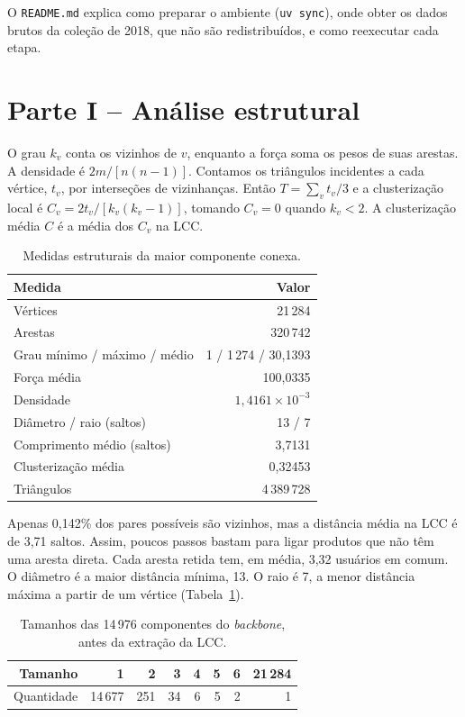 \documentclass[sigconf,nonacm]{webmedia}
\begin{document}
O \texttt{README.md} explica como preparar o ambiente
(\texttt{uv sync}), onde obter os dados brutos da coleção de 2018,
que não são redistribuídos, e como reexecutar cada etapa.

\section{Parte I -- Análise estrutural}
\label{sec:parte1}

O grau \(k_v\) conta os vizinhos de \(v\), enquanto a força soma
os pesos de suas arestas. A densidade é \(2m/[n(n-1)]\).
Contamos os triângulos incidentes a cada vértice, \(t_v\), por
interseções de vizinhanças. Então \(T=\sum_v t_v/3\) e a
clusterização local é \(C_v=2t_v/[k_v(k_v-1)]\), tomando
\(C_v=0\) quando \(k_v<2\). A clusterização média \(C\) é a
média dos \(C_v\) na LCC.

\begin{table}[tbp]
\centering
\caption{Medidas estruturais da maior componente conexa.}
\label{tab:estrutural}
\small
\begin{tabular}{@{}lr@{}}
\toprule
Medida & Valor \\
\midrule
Vértices & 21\,284 \\
Arestas & 320\,742 \\
Grau mínimo / máximo / médio & 1 / 1\,274 / 30,1393 \\
Força média & 100,0335 \\
Densidade & \(1{,}4161\times10^{-3}\) \\
Diâmetro / raio (saltos) & 13 / 7 \\
Comprimento médio (saltos) & 3,7131 \\
Clusterização média & 0,32453 \\
Triângulos & 4\,389\,728 \\
\bottomrule
\end{tabular}
\end{table}

Apenas 0,142\% dos pares possíveis são vizinhos, mas a distância
média na LCC é de 3,71 saltos. Assim, poucos passos bastam para
ligar produtos que não têm uma aresta direta. Cada aresta retida
tem, em média, 3,32 usuários em comum. O diâmetro é a maior distância mínima, 13. O raio é 7, a
menor distância máxima a partir de um vértice
(Tabela~\ref{tab:estrutural}).

\begin{table}[tbp]
\centering
\caption{Tamanhos das 14\,976 componentes do \emph{backbone}, antes da extração da LCC.}
\label{tab:componentes}
\begin{tabular}{@{}rrrrrrrr@{}}
\toprule
Tamanho & 1 & 2 & 3 & 4 & 5 & 6 & 21\,284 \\
\midrule
Quantidade & 14\,677 & 251 & 34 & 6 & 5 & 2 & 1 \\
\bottomrule
\end{tabular}
\end{table}
\end{document}
